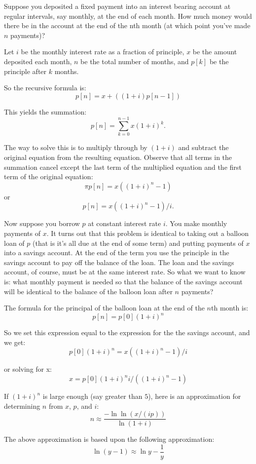 Suppose you deposited a fixed payment into an interest bearing account
at regular intervals, say monthly, at the end of each month.  How much
money would there be in the account at the end of the nth month (at
which point you've made $n$ payments)?

Let $i$ be the monthly interest rate as a fraction of principle, $x$ be
the amount deposited each month, $n$ be the total number of months, and
$p[k]$ be the principle after $k$ months.

So the recursive formula is:
\begin{equation}
  \label{eq:1}
  p[n] = x + ((1 + i) p[n-1])
\end{equation}

This yields the summation:
\[
p[n]=\sum_{k=0}^{n-1}x (1 + i)^k.
\]

The way to solve this is to multiply through by $(1 + i)$ and subtract
the original equation from the resulting equation.  Observe that all
terms in the summation cancel except the last term of the multiplied
equation and the first term of the original equation:
\[
\pi p[n] = x ((1 + i)^n - 1)
\]
or
\[
p[n] = x ((1 + i)^n - 1) / i.
\]

Now suppose you borrow $p$ at constant interest rate $i$.  You make
monthly payments of $x$.  It turns out that this problem is identical to
taking out a balloon loan of $p$ (that is it's all due at the end of
some term) and putting payments of $x$ into a savings account.  At the
end of the term you use the principle in the savings account to pay off
the balance of the loan.  The loan and the savings account, of course,
must be at the same interest rate.  So what we want to know is: what
monthly payment is needed so that the balance of the savings account
will be identical to the balance of the balloon loan after $n$ payments?

The formula for the principal of the balloon loan at the end of the
$n$th month is:
\[
p[n] = p[0] (1 + i)^n
\]

So we set this expression equal to the expression for the the savings
account, and we get:
\[
p[0] (1 + i)^n = x ((1 + i)^n - 1) / i
\]

or solving for x:
\[
x = p[0] (1 + i)^n i / ((1 + i)^n - 1)
\]

If $(1 + i)^n$ is large enough (say greater than $5$), here is an
approximation for determining $n$ from $x$, $p$, and $i$:
\[
n \approx \frac{-\ln \ln(x/(ip))}{\ln(1+i)}
\]

The above approximation is based upon the following approximation:
\[
\ln(y - 1) \approx \ln y - \frac{1}{y}
\]

